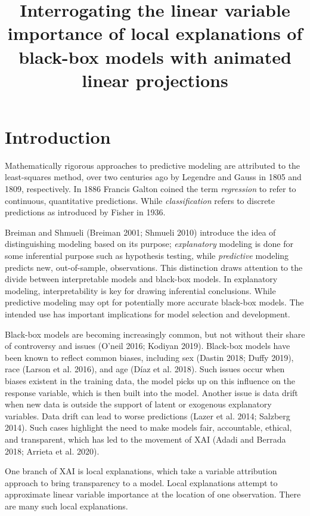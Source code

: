 \documentclass[
  article]{article}
\title{Interrogating the linear variable importance of local explanations of black-box models with animated linear projections}
\author{}
\date{\vspace{-2.5em}}
\begin{document}
\maketitle

\hypertarget{sec:intro}{%
\section{Introduction}\label{sec:intro}}

Mathematically rigorous approaches to predictive modeling are attributed to the least-squares method, over two centuries ago by Legendre and Gauss in 1805 and 1809, respectively. In 1886 Francis Galton coined the term \emph{regression} to refer to continuous, quantitative predictions. While \emph{classification} refers to discrete predictions as introduced by Fisher in 1936.

Breiman and Shmueli (Breiman 2001; Shmueli 2010) introduce the idea of distinguishing modeling based on its purpose; \emph{explanatory} modeling is done for some inferential purpose such as hypothesis testing, while \emph{predictive} modeling predicts new, out-of-sample, observations. This distinction draws attention to the divide between interpretable models and black-box models. In explanatory modeling, interpretability is key for drawing inferential conclusions. While predictive modeling may opt for potentially more accurate black-box models. The intended use has important implications for model selection and development.

Black-box models are becoming increasingly common, but not without their share of controversy and issues (O'neil 2016; Kodiyan 2019). Black-box models have been known to reflect common biases, including sex (Dastin 2018; Duffy 2019), race (Larson et al. 2016), and age (Díaz et al. 2018). Such issues occur when biases existent in the training data, the model picks up on this influence on the response variable, which is then built into the model. Another issue is data drift when new data is outside the support of latent or exogenous explanatory variables. Data drift can lead to worse predictions (Lazer et al. 2014; Salzberg 2014). Such cases highlight the need to make models fair, accountable, ethical, and transparent, which has led to the movement of XAI (Adadi and Berrada 2018; Arrieta et al. 2020).

One branch of XAI is local explanations, which take a variable attribution approach to bring transparency to a model. Local explanations attempt to approximate linear variable importance at the location of one observation. There are many such local explanations.
\end{document}
